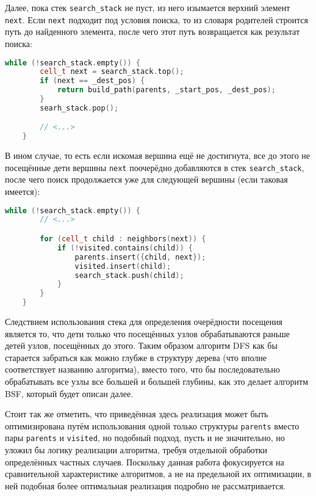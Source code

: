 \documentclass[a4paper, 12pt]{article}
\begin{document}
Далее, пока стек \verb|search_stack| не пуст, из него изымается верхний элемент \verb|next|. Если \verb|next| подходит под условия поиска, то из словаря родителей строится путь до найденного элемента, после чего этот путь возвращается как результат поиска:

\begin{lstlisting}[language=C++]
    while (!search_stack.empty()) {
        cell_t next = search_stack.top();
        if (next == _dest_pos) {
            return build_path(parents, _start_pos, _dest_pos);
        }
        searh_stack.pop();

        // <...>
    }
\end{lstlisting}

В ином случае, то есть если искомая вершина ещё не достигнута, все до этого не посещённые дети вершины \verb|next| поочерёдно добавляются в стек \verb|search_stack|, после чего поиск продолжается уже для следующей вершины (если таковая имеется):

\begin{lstlisting}[language=C++]
    while (!search_stack.empty()) {
        // <...>

        for (cell_t child : neighbors(next)) {
            if (!visited.contains(child)) {
                parents.insert({child, next});
                visited.insert(child);
                search_stack.push(child);
            }
        }
    }
\end{lstlisting}

Следствием использования стека для определения очерёдности посещения является то, что дети только что посещённых узлов обрабатываются раньше детей узлов, посещённых до этого. Таким образом алгоритм DFS как бы старается забраться как можно глубже в структуру дерева (что вполне соответствует названию алгоритма), вместо того, что бы последовательно обрабатывать все узлы все большей и большей глубины, как это делает алгоритм BSF, который будет описан далее.

Стоит так же отметить, что приведённая здесь реализация может быть оптимизирована путём использования одной только структуры \verb|parents| вместо пары \verb|parents| и \verb|visited|, но подобный подход, пусть и не значительно, но уложил бы логику реализации алгоритма, требуя отдельной обработки определённых частных случаев. Поскольку данная работа фокусируется на сравнительной характеристике алгоритмов, а не на предельной их оптимизации, в ней подобная более оптимальная реализация подробно не рассматривается.
\end{document}
